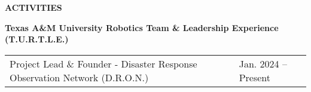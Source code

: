 \documentclass[18pt]{article}
\begin{document}




\vspace{-0.75\baselineskip}
\begin{center}
    \textbf{ACTIVITIES}
    \hrulefill
\end{center}
\vspace{-0.5\baselineskip}

\textbf{Texas A\&M University Robotics Team \& Leadership Experience (T.U.R.T.L.E.)}

\begin{tabular}{p{} p{}}
    Project Lead \& Founder - Disaster Response Observation Network (D.R.O.N.) &
    \hfill Jan. 2024 – Present
\end{tabular}\\
\end{document}
